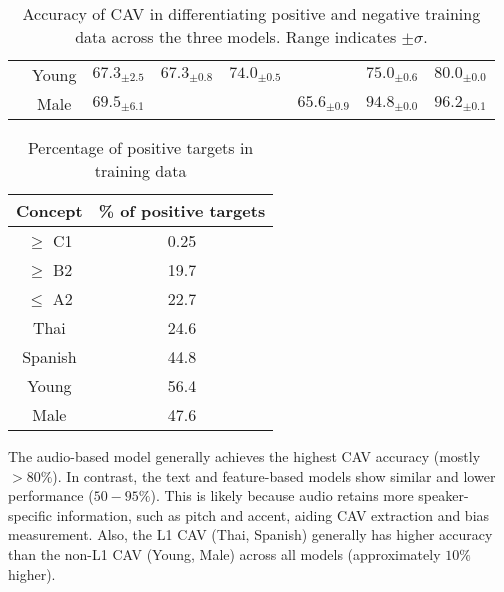 \begin{table}[H]
\begin{tabular}{|c|c|cc|cc|cc|}
                          & Young                             & \multicolumn{1}{c|}{$67.3_{\pm 2.5}$}                     & $67.3_{\pm 0.8}$                      & \multicolumn{1}{c|}{$74.0_{\pm 0.5}$}                     & \cellcolor{red!15}{$56.4_{\pm 0.3}$} & \multicolumn{1}{c|}{$75.0_{\pm 0.6}$}                     & $80.0_{\pm 0.0}$ \\ \cline{2-8}
                          & Male                              & \multicolumn{1}{c|}{$69.5_{\pm 6.1}$}                     & \cellcolor{red!15}{$51.7_{\pm 9.1}$}  & \multicolumn{1}{c|}{\cellcolor{red!15}{$59.2_{\pm 0.5}$}} & $65.6_{\pm 0.9}$                     & \multicolumn{1}{c|}{$94.8_{\pm 0.0}$}                     & $96.2_{\pm 0.1}$ \\ \hline
    \end{tabular}

    \caption{Accuracy of CAV in differentiating positive and negative training data across the three models. Range indicates $\pm \sigma$.}
    \label{tab:CAV_accuracy_combined}
\end{table}

\begin{table}[H]
    \centering
    \begin{tabular}{|c|c|}
        \hline
        \textbf{Concept} & \textbf{\% of positive targets} \\
        \hline
        $\geq$ C1        & 0.25                            \\
        $\geq$ B2        & 19.7                            \\
        $\leq$ A2        & 22.7                            \\ \hline
        Thai             & 24.6                            \\
        Spanish          & 44.8                            \\ \hline
        Young            & 56.4                            \\ \hline
        Male             & 47.6                            \\
        \hline
    \end{tabular}
    \caption{Percentage of positive targets in training data}
    \label{tab:pos_target}
\end{table}

The audio-based model generally achieves the highest CAV accuracy (mostly $> 80\%$). In contrast, the text and feature-based models show similar and lower performance ($50-95\%$). This is likely because audio retains more speaker-specific information, such as pitch and accent, aiding CAV extraction and bias measurement. Also, the L1 CAV (Thai, Spanish) generally has higher accuracy than the non-L1 CAV (Young, Male) across all models (approximately $10\%$ higher).

